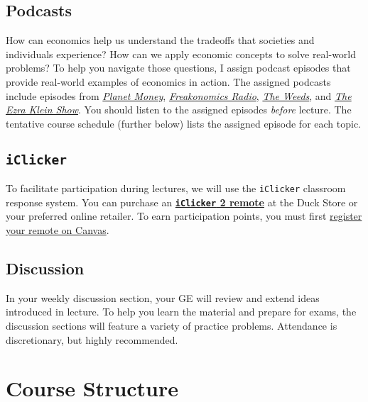 \documentclass[11pt]{article}
\begin{document}
\subsection*{Podcasts}

How can economics help us understand the tradeoffs that societies and individuals experience? How can we apply economic concepts to solve real-world problems? To help you navigate those questions, I assign podcast episodes that provide real-world examples of economics in action. The assigned podcasts include episodes from \href{https://www.npr.org/sections/money/}{\textit{Planet Money}}, \href{https://www.npr.org/podcasts/452538045/freakonomics-radio}{\textit{Freakonomics Radio}}, \href{https://www.vox.com/the-weeds}{\textit{The Weeds}}, and \href{https://www.vox.com/ezra-klein-show-podcast}{\textit{The Ezra Klein Show}}. You should listen to the assigned episodes \textit{before} lecture. The tentative course schedule (further below) lists the assigned episode for each topic.

\subsection*{\texttt{iClicker}} 

To facilitate participation during lectures, we will use the \texttt{iClicker} classroom response system. You can purchase an \href{https://www.uoduckstore.com/Iclicker-2-142928047}{\textbf{\texttt{iClicker} 2 remote}} at the Duck Store or your preferred online retailer. To earn participation points, you must first \href{https://canvas.uoregon.edu/courses/26168/pages/enabling-browser-cookies-and-registering-i%3Eclickers?module_item_id=108448}{register your remote on Canvas}.



\subsection*{Discussion} 

In your weekly discussion section, your GE will review and extend ideas introduced in lecture. To help you learn the material and prepare for exams, the discussion sections will feature a variety of practice problems. Attendance is discretionary, but highly recommended. 

\newpage
\section*{Course Structure}
\end{document}
